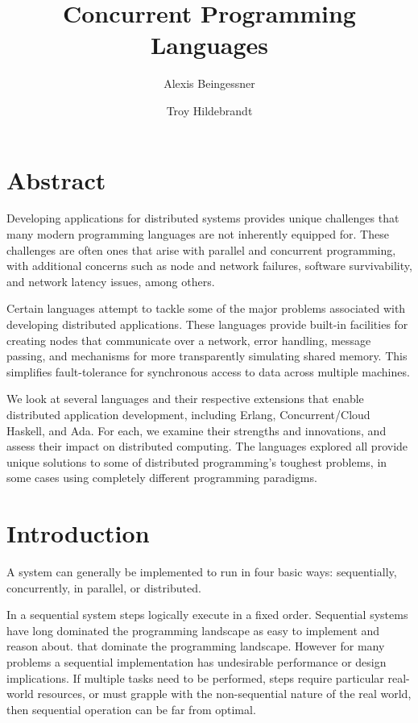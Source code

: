 \documentclass[10pt,a4paper,twocolumn]{article}
\begin{document}
\title{Concurrent Programming Languages}

\author{
Alexis Beingessner
\and
Troy Hildebrandt
}

\maketitle

\section{Abstract}

Developing applications for distributed systems provides unique challenges that
many modern programming languages are not inherently equipped for. These
challenges are often ones that arise with parallel and concurrent programming,
with additional concerns such as node and network failures, software
survivability, and network latency issues, among others.

Certain languages attempt to tackle some of the major problems associated with
developing distributed applications. These languages provide built-in facilities
for creating nodes that communicate over a network, error handling, message
passing, and mechanisms for more transparently simulating shared memory. This
simplifies fault-tolerance for synchronous access to data across multiple
machines.

We look at several languages and their respective extensions that enable
distributed application development, including Erlang, Concurrent/Cloud Haskell,
and Ada. For each, we examine their strengths and innovations, and assess their
impact on distributed computing. The languages explored all provide unique
solutions to some of distributed programming's toughest problems, in some cases
using completely different programming paradigms.

\section{Introduction}

A system can generally be implemented to run in four basic ways:
sequentially, concurrently, in parallel, or distributed. 

In a sequential system steps logically execute in a fixed order. Sequential
systems have long dominated the programming landscape as easy to implement and
reason about.  that dominate the programming landscape. However for many
problems a sequential implementation has undesirable performance or design
implications. If multiple tasks need to be performed, steps require particular
real-world resources, or must grapple with the non-sequential nature of the real
world, then sequential operation can be far from optimal.
\end{document}
